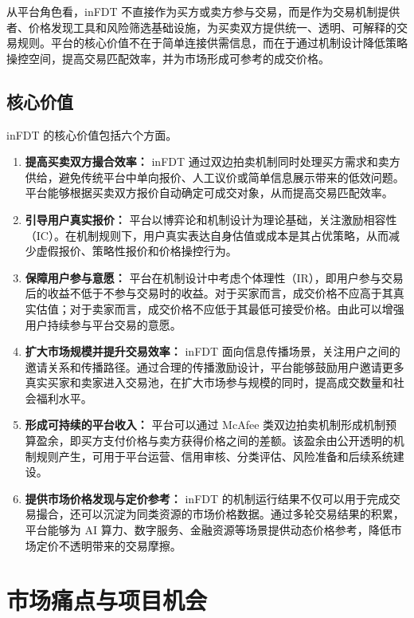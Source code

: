 \documentclass[UTF8,a4paper,12pt]{ctexart}
\begin{document}
从平台角色看，inFDT 不直接作为买方或卖方参与交易，而是作为交易机制提供者、价格发现工具和风险筛选基础设施，为买卖双方提供统一、透明、可解释的交易规则。平台的核心价值不在于简单连接供需信息，而在于通过机制设计降低策略操控空间，提高交易匹配效率，并为市场形成可参考的成交价格。

\subsection{核心价值}

inFDT 的核心价值包括六个方面。

\begin{enumerate}
    \item \textbf{提高买卖双方撮合效率：} inFDT 通过双边拍卖机制同时处理买方需求和卖方供给，避免传统平台中单向报价、人工议价或简单信息展示带来的低效问题。平台能够根据买卖双方报价自动确定可成交对象，从而提高交易匹配效率。
    \item \textbf{引导用户真实报价：} 平台以博弈论和机制设计为理论基础，关注激励相容性（IC）。在机制规则下，用户真实表达自身估值或成本是其占优策略，从而减少虚假报价、策略性报价和价格操控行为。
    \item \textbf{保障用户参与意愿：} 平台在机制设计中考虑个体理性（IR），即用户参与交易后的收益不低于不参与交易时的收益。对于买家而言，成交价格不应高于其真实估值；对于卖家而言，成交价格不应低于其最低可接受价格。由此可以增强用户持续参与平台交易的意愿。
    \item \textbf{扩大市场规模并提升交易效率：} inFDT 面向信息传播场景，关注用户之间的邀请关系和传播路径。通过合理的传播激励设计，平台能够鼓励用户邀请更多真实买家和卖家进入交易池，在扩大市场参与规模的同时，提高成交数量和社会福利水平。
    \item\textbf{形成可持续的平台收入：} 平台可以通过 McAfee 类双边拍卖机制形成机制预算盈余，即买方支付价格与卖方获得价格之间的差额。该盈余由公开透明的机制规则产生，可用于平台运营、信用审核、分类评估、风险准备和后续系统建设。
    \item \textbf{提供市场价格发现与定价参考：} inFDT 的机制运行结果不仅可以用于完成交易撮合，还可以沉淀为同类资源的市场价格数据。通过多轮交易结果的积累，平台能够为 AI 算力、数字服务、金融资源等场景提供动态价格参考，降低市场定价不透明带来的交易摩擦。 \end{enumerate}


\newpage
\section{市场痛点与项目机会}
\end{document}
